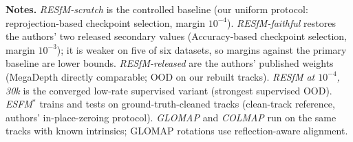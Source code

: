 \documentclass[10pt,letterpaper]{article}
\begin{document}
\begin{table}[t]\centering\footnotesize
\caption{\textbf{Seeds per cell} (evaluation replicates behind each band; $1$ = single run / reference row).}
\setlength{\tabcolsep}{4pt}%
%
\end{table}

\vspace{0.4cm}\noindent\textbf{Notes.} \emph{RESfM-scratch} is the controlled baseline (our
uniform protocol: reprojection-based checkpoint selection, margin $10^{-4}$). \emph{RESfM-faithful}
restores the authors' two released secondary values (Accuracy-based checkpoint selection, margin
$10^{-3}$); it is weaker on five of six datasets, so margins against the primary baseline are lower
bounds. \emph{RESfM-released} are the authors' published weights (MegaDepth directly comparable; OOD
on our rebuilt tracks). \emph{RESfM at $10^{-4}$, 30k} is the converged low-rate supervised variant
(strongest supervised OOD). \emph{ESFM$^{\ast}$} trains and tests on ground-truth-cleaned tracks
(clean-track reference, authors' in-place-zeroing protocol). \emph{GLOMAP} and \emph{COLMAP} run on
the same tracks with known intrinsics; GLOMAP rotations use reflection-aware alignment.
\end{document}
